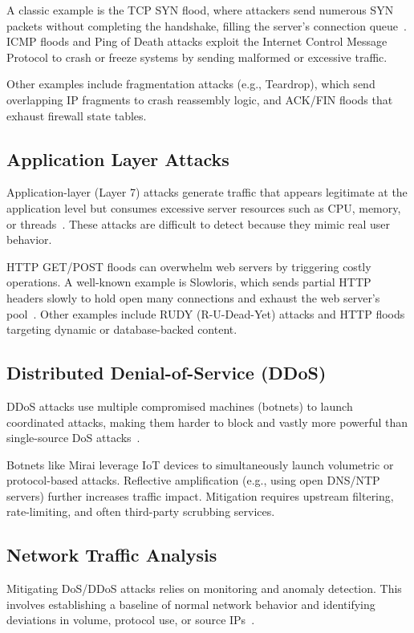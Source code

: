 \documentclass[16pt]{report}
\begin{document}
A classic example is the TCP SYN flood, where attackers send numerous SYN packets without completing the handshake, filling the server’s connection queue~\cite{imperva_dos}. ICMP floods and Ping of Death attacks exploit the Internet Control Message Protocol to crash or freeze systems by sending malformed or excessive traffic.

Other examples include fragmentation attacks (e.g., Teardrop), which send overlapping IP fragments to crash reassembly logic, and ACK/FIN floods that exhaust firewall state tables.

\subsection{Application Layer Attacks}
Application-layer (Layer 7) attacks generate traffic that appears legitimate at the application level but consumes excessive server resources such as CPU, memory, or threads~\cite{fidelis_dos}. These attacks are difficult to detect because they mimic real user behavior.

HTTP GET/POST floods can overwhelm web servers by triggering costly operations. A well-known example is Slowloris, which sends partial HTTP headers slowly to hold open many connections and exhaust the web server’s pool~\cite{netscout_slowloris}. Other examples include RUDY (R-U-Dead-Yet) attacks and HTTP floods targeting dynamic or database-backed content.

\subsection{Distributed Denial-of-Service (DDoS)}
DDoS attacks use multiple compromised machines (botnets) to launch coordinated attacks, making them harder to block and vastly more powerful than single-source DoS attacks~\cite{fidelis_dos}.

Botnets like Mirai leverage IoT devices to simultaneously launch volumetric or protocol-based attacks. Reflective amplification (e.g., using open DNS/NTP servers) further increases traffic impact. Mitigation requires upstream filtering, rate-limiting, and often third-party scrubbing services.

\subsection{Network Traffic Analysis}
Mitigating DoS/DDoS attacks relies on monitoring and anomaly detection. This involves establishing a baseline of normal network behavior and identifying deviations in volume, protocol use, or source IPs~\cite{fidelis_dos, mdpi_dos}.
\end{document}
